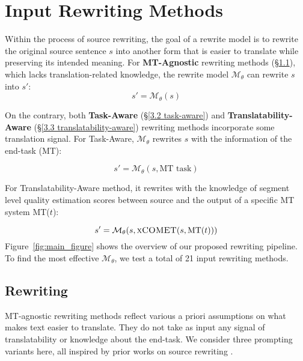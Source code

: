 
\section{Input Rewriting Methods}

\label{3 method}
Within the process of source rewriting, the goal of a rewrite model is to rewrite the original source sentence $s$ into another form that is easier to translate while preserving its intended meaning. For \textbf{MT-Agnostic} rewriting methods (\S \ref{3.1 mt-agnostic}), which lacks translation-related knowledge, the rewrite model $\mathcal{M}_{\theta}$ can rewrite $s$ into $s'$:
\begin{equation}
    s' = \mathcal{M}_{\theta}(s)
\end{equation}

On the contrary, both \textbf{Task-Aware} (\S \ref{3.2 task-aware}) and \textbf{Translatability-Aware} (\S \ref{3.3 translatability-aware}) rewriting methods incorporate some translation signal. For Task-Aware, $\mathcal{M}_{\theta}$ rewrites $s$ with the information of the end-task (MT):

\begin{equation}
    s' = \mathcal{M}_{\theta}(s, \text{MT task})
\end{equation}

For Translatability-Aware method, it rewrites with the knowledge of segment level quality estimation scores between source and the output of a specific MT system MT($t$):

\begin{equation}
    s' = \mathcal{M}_{\theta}(s, \text{\textsc{xCOMET}}(s,\text{MT}(t)))
\end{equation}
Figure~\ref{fig:main_figure} shows the overview of our proposed rewriting pipeline. To find the most effective $\mathcal{M}_{\theta}$, we test a total of 21 input rewriting methods.


\subsection{ Rewriting}
\label{3.1 mt-agnostic}
MT-agnostic rewriting methods reflect various a priori assumptions on what makes text easier to translate. They do not take as input any signal of translatability or knowledge about the end-task. We consider three prompting variants here, all inspired by prior works on source rewriting \citep{mirkin-etal-2009-source, mirkin-etal-2013-sort, stajner-popovic-2016-text}.

